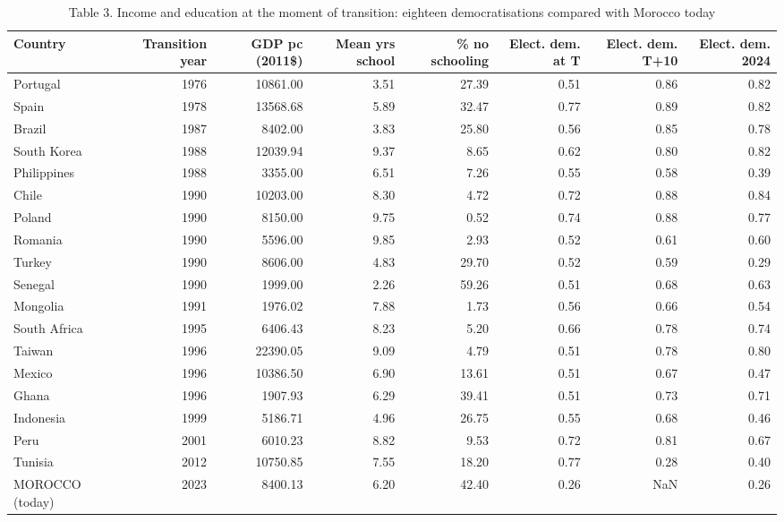 \begin{table}
\caption{Table 3. Income and education at the moment of transition: eighteen democratisations compared with Morocco today}
\label{tab:T3_benchmark_transitions}
\begin{tabular}{lrrrrrrr}
\toprule
Country & Transition year & GDP pc (2011\$) & Mean yrs school & \% no schooling & Elect. dem. at T & Elect. dem. T+10 & Elect. dem. 2024 \\
\midrule
Portugal & 1976 & 10861.00 & 3.51 & 27.39 & 0.51 & 0.86 & 0.82 \\
Spain & 1978 & 13568.68 & 5.89 & 32.47 & 0.77 & 0.89 & 0.82 \\
Brazil & 1987 & 8402.00 & 3.83 & 25.80 & 0.56 & 0.85 & 0.78 \\
South Korea & 1988 & 12039.94 & 9.37 & 8.65 & 0.62 & 0.80 & 0.82 \\
Philippines & 1988 & 3355.00 & 6.51 & 7.26 & 0.55 & 0.58 & 0.39 \\
Chile & 1990 & 10203.00 & 8.30 & 4.72 & 0.72 & 0.88 & 0.84 \\
Poland & 1990 & 8150.00 & 9.75 & 0.52 & 0.74 & 0.88 & 0.77 \\
Romania & 1990 & 5596.00 & 9.85 & 2.93 & 0.52 & 0.61 & 0.60 \\
Turkey & 1990 & 8606.00 & 4.83 & 29.70 & 0.52 & 0.59 & 0.29 \\
Senegal & 1990 & 1999.00 & 2.26 & 59.26 & 0.51 & 0.68 & 0.63 \\
Mongolia & 1991 & 1976.02 & 7.88 & 1.73 & 0.56 & 0.66 & 0.54 \\
South Africa & 1995 & 6406.43 & 8.23 & 5.20 & 0.66 & 0.78 & 0.74 \\
Taiwan & 1996 & 22390.05 & 9.09 & 4.79 & 0.51 & 0.78 & 0.80 \\
Mexico & 1996 & 10386.50 & 6.90 & 13.61 & 0.51 & 0.67 & 0.47 \\
Ghana & 1996 & 1907.93 & 6.29 & 39.41 & 0.51 & 0.73 & 0.71 \\
Indonesia & 1999 & 5186.71 & 4.96 & 26.75 & 0.55 & 0.68 & 0.46 \\
Peru & 2001 & 6010.23 & 8.82 & 9.53 & 0.72 & 0.81 & 0.67 \\
Tunisia & 2012 & 10750.85 & 7.55 & 18.20 & 0.77 & 0.28 & 0.40 \\
MOROCCO (today) & 2023 & 8400.13 & 6.20 & 42.40 & 0.26 & NaN & 0.26 \\
\bottomrule
\end{tabular}
\end{table}
